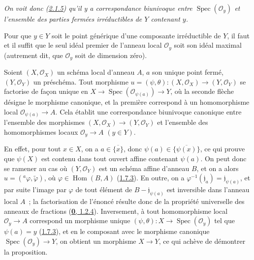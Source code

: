 \emph{On voit donc \textup{(\hyperref[I.2.1.5-fr]{2.1.5})} qu'il y a correspondance
biunivoque entre $\operatorname{Spec}(\mathscr{O}_y)$ et l'ensemble des
parties fermées irréductibles de $Y$ contenant $y$.}

\begin{corollary}[2.4.3]
\label{I.2.4.3-fr}
Pour que $y\in Y$ soit le point générique d'une composante irréductible de
$Y$, il faut et il suffit que le seul idéal premier de l'anneau local
$\mathscr{O}_y$ soit son idéal maximal \textup{(autrement dit, que} $\mathscr{O}_y$
\textup{soit} de dimension zéro).
\end{corollary}

\begin{proposition}[2.4.4]
\label{I.2.4.4-fr}
Soient $(X,\mathscr{O}_X)$ un schéma local d'anneau $A$, $a$ son unique point
fermé, $(Y,\mathscr{O}_Y)$ un préschéma. Tout morphisme
$u=(\psi,\theta):(X,\mathscr{O}_X)\to(Y,\mathscr{O}_Y)$ se factorise de façon
unique en
$X\to\operatorname{Spec}(\mathscr{O}_{\psi(a)})\to Y$, où la seconde flèche
désigne le morphisme canonique, et la première correspond à un homomorphisme
local $\mathscr{O}_{\psi(a)}\to A$. Cela établit une correspondance biunivoque
canonique entre l'ensemble des morphismes
$(X,\mathscr{O}_X)\to(Y,\mathscr{O}_Y)$ et l'ensemble des homomorphismes locaux
$\mathscr{O}_y\to A$ $(y\in Y)$.
\end{proposition}

En effet, pour tout $x\in X$, on a $a\in\overline{\{x\}}$, donc
$\psi(a)\in\overline{\{\psi(x)\}}$, ce qui prouve que $\psi(X)$ est contenu
dans tout ouvert affine contenant $\psi(a)$. On peut donc se ramener au cas où
$(Y,\mathscr{O}_Y)$ est un schéma affine d'anneau $B$, et on a alors
$u=({}^a\varphi,\widetilde{\varphi})$, où
$\varphi\in\operatorname{Hom}(B,A)$ (\hyperref[I.1.7.3-fr]{1.7.3}). En outre,
on a $\varphi^{-1}(\mathfrak{j}_a)=\mathfrak{j}_{\psi(a)}$, et par suite
l'image par $\varphi$ de tout élément de $B-\mathfrak{j}_{\psi(a)}$ est
inversible dans l'anneau local $A$~; la factorisation de l'énoncé résulte donc
de la propriété universelle des anneaux de fractions
(\hyperref[0.1.2.4-fr]{\textbf{0}, 1.2.4}). Inversement, à tout homomorphisme local
$\mathscr{O}_y\to A$ correspond un morphisme unique
$(\psi,\theta):X\to\operatorname{Spec}(\mathscr{O}_y)$ tel que $\psi(a)=y$
(\hyperref[I.1.7.3-fr]{1.7.3}), et en le composant avec le morphisme canonique
$\operatorname{Spec}(\mathscr{O}_y)\to Y$, on obtient un morphisme $X\to Y$,
ce qui achève de démontrer la proposition.

